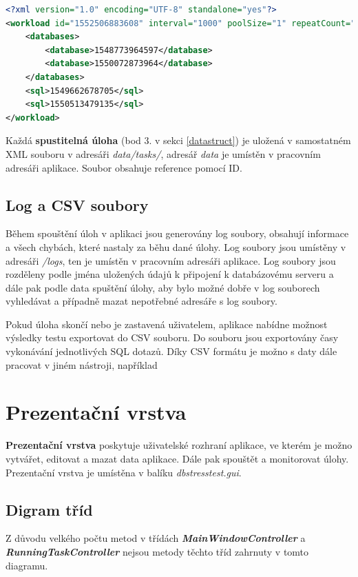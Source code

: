 \documentclass[czech,bachelor,public,dept460,male,cpdeclaration,twoside]{diploma}
\begin{document}
\begin{minipage}{\linewidth}
\begin{lstlisting}[caption=Spustitelná úloha ve formátu XML\label{lst:task},language=XML] 
<?xml version="1.0" encoding="UTF-8" standalone="yes"?>
<workload id="1552506883608" interval="1000" poolSize="1" repeatCount="-1" taskName="SuperTest">
    <databases>
        <database>1548773964597</database>
        <database>1550072873964</database>
    </databases>
    <sql>1549662678705</sql>
    <sql>1550513479135</sql>
</workload>
\end{lstlisting}
Každá \textbf{spustitelná úloha} (bod 3. v sekci \ref{datastruct}) je uložená v samostatném XML souboru v adresáři \textit{data/tasks/}, adresář \textit{data} je umístěn v pracovním adresáři aplikace. Soubor obsahuje reference pomocí ID.
\end{minipage}

\newpage
\subsection{Log a CSV soubory} \label{logs}
Během spouštění úloh v aplikaci jsou generovány log soubory, obsahují informace a všech chybách, které nastaly za běhu dané úlohy. Log soubory jsou umístěny v adresáři \textit{/logs}, ten je umístěn v pracovním adresáři aplikace. Log soubory jsou rozděleny podle jména uložených údajů k připojení k databázovému serveru a dále pak podle data spuštění úlohy, aby bylo možné dobře v log souborech vyhledávat a případně mazat nepotřebné adresáře s log soubory.



Pokud úloha skončí nebo je zastavená uživatelem, aplikace nabídne možnost výsledky testu exportovat do CSV souboru. Do souboru jsou exportovány časy vykonávání jednotlivých SQL dotazů. Díky CSV formátu je možno s daty dále pracovat v jiném nástroji, například 

\section{Prezentační vrstva} \label{presentlayer}
\textbf{Prezentační vrstva} poskytuje uživatelské rozhraní aplikace, ve kterém je možno vytvářet, editovat a mazat data aplikace. Dále pak spouštět a monitorovat úlohy. Prezentační vrstva je umístěna v balíku \textit{dbstresstest.gui}.
\subsection{Digram tříd} \label{prezent}
Z důvodu velkého počtu metod v třídách \textbf{\emph{MainWindowController}} a \textbf{\emph{RunningTaskController}} nejsou metody těchto tříd zahrnuty v tomto diagramu.
\end{document}
